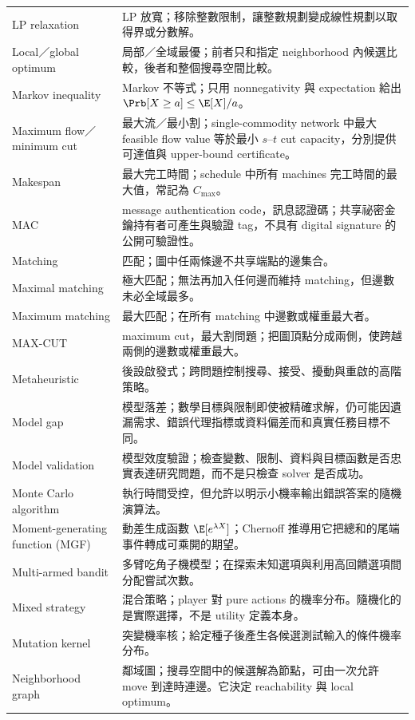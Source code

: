 \documentclass[11pt,a4paper,oneside,openany]{book}
\begin{document}
\begin{longtable}{@{}>{\raggedright\arraybackslash}p{}p{}@{}}
LP relaxation & LP 放寬；移除整數限制，讓整數規劃變成線性規劃以取得界或分數解。 \\
Local／global optimum & 局部／全域最優；前者只和指定 neighborhood 內候選比較，後者和整個搜尋空間比較。 \\
Markov inequality & Markov 不等式；只用 nonnegativity 與 expectation 給出 $\Prb[X\ge a]\le\E[X]/a$。 \\
Maximum flow／minimum cut & 最大流／最小割；single-commodity network 中最大 feasible flow value 等於最小 $s$--$t$ cut capacity，分別提供可達值與 upper-bound certificate。 \\
Makespan & 最大完工時間；schedule 中所有 machines 完工時間的最大值，常記為 $C_{\max}$。 \\
MAC & message authentication code，訊息認證碼；共享祕密金鑰持有者可產生與驗證 tag，不具有 digital signature 的公開可驗證性。 \\
Matching & 匹配；圖中任兩條邊不共享端點的邊集合。 \\
Maximal matching & 極大匹配；無法再加入任何邊而維持 matching，但邊數未必全域最多。 \\
Maximum matching & 最大匹配；在所有 matching 中邊數或權重最大者。 \\
MAX-CUT & maximum cut，最大割問題；把圖頂點分成兩側，使跨越兩側的邊數或權重最大。 \\
Metaheuristic & 後設啟發式；跨問題控制搜尋、接受、擾動與重啟的高階策略。 \\
Model gap & 模型落差；數學目標與限制即使被精確求解，仍可能因遺漏需求、錯誤代理指標或資料偏差而和真實任務目標不同。 \\
Model validation & 模型效度驗證；檢查變數、限制、資料與目標函數是否忠實表達研究問題，而不是只檢查 solver 是否成功。 \\
Monte Carlo algorithm & 執行時間受控，但允許以明示小機率輸出錯誤答案的隨機演算法。 \\
Moment-generating function (MGF) & 動差生成函數 $\E[e^{\lambda X}]$；Chernoff 推導用它把總和的尾端事件轉成可乘開的期望。 \\
Multi-armed bandit & 多臂吃角子機模型；在探索未知選項與利用高回饋選項間分配嘗試次數。 \\
Mixed strategy & 混合策略；player 對 pure actions 的機率分布。隨機化的是實際選擇，不是 utility 定義本身。 \\
Mutation kernel & 突變機率核；給定種子後產生各候選測試輸入的條件機率分布。 \\
Neighborhood graph & 鄰域圖；搜尋空間中的候選解為節點，可由一次允許 move 到達時連邊。它決定 reachability 與 local optimum。 \\

\end{longtable}
\end{document}
